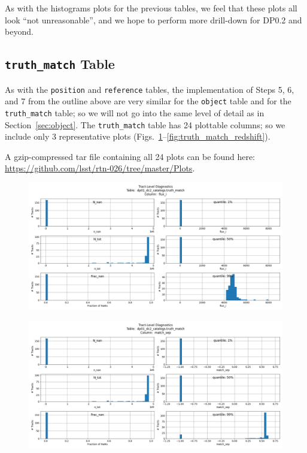 \documentclass[DM,authoryear,toc]{lsstdoc}
\begin{document}
As with the histograms plots for the previous tables, we feel that
these plots all look ``not unreasonable'', and we hope to perform more
drill-down for DP0.2 and beyond.


\subsection{\texttt{truth\_match} Table} \label{sec:truth_match}

As with the \texttt{position} and \texttt{reference} tables, the
implementation of Steps 5, 6, and 7 from the outline above are very
similar for the \texttt{object} table and for the \texttt{truth\_match}
table; so we will not go into the same level of detail as in
Section~\ref{sec:object}.  The \texttt{truth\_match} table has 24
plottable columns; so we include only 3 representative plots
(Figs.~\ref{fig:truth_match_flux_i}--\ref{fig:truth_match_redshift}).

A gzip-compressed tar file containing all 24 plots can be found
here: \url{https://github.com/lsst/rtn-026/tree/master/Plots}.



\begin{figure}[h]
\centering
\includegraphics[width=1.0\linewidth]{Plots/TAP_verify_DP01.dp01_dc2_catalogs.truth_match.flux_i.png}
\caption{}
\label{fig:truth_match_flux_i}
\end{figure}

\begin{figure}[h]
\centering
\includegraphics[width=1.0\linewidth]{Plots/TAP_verify_DP01.dp01_dc2_catalogs.truth_match.match_sep.png}
\caption{}
\label{fig:truth_match_match_sep}
\end{figure}
\end{document}
